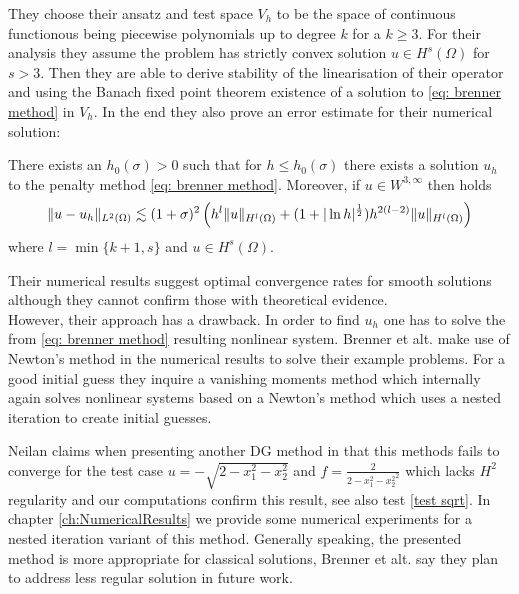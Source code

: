 They choose their ansatz and test space $V_h$ to be the space of continuous functionous being piecewise polynomials up to degree $k$ for a $k \geq 3$. For their analysis they assume the \MA problem has strictly convex solution $u\in H^s(\Omega)$ for $s>3$. Then they are able to derive stability of the linearisation of their operator and using the Banach fixed point theorem existence of a solution to \eqref{eq: brenner method} in $V_h$. In the end they also prove an error estimate for their numerical solution:
\begin{theorem}\label{thm: error estimate brenner}
	There exists an $h_0(\sigma) > 0$ such that for $h \leq h_0(\sigma)$ there exists a solution $u_h$ to the penalty method \eqref{eq: brenner method}. Moreover, if $u \in W^{3,\infty}$ then holds
	\begin{align*}
		\lVert u-u_h \rVert_{L^2(\Omega)} \lesssim (1+\sigma)^2 
		                        \left(h^{l} \lVert u \rVert_{H^l(\Omega)} + (1+ | \ln h |^{\frac 1 2 }) h^{2(l-2)} \lVert u \rVert_{H^l(\Omega)} \right)
	\end{align*}
where $l=\min\{k+1,s\}$ and $u \in H^s(\Omega)$. 
	
\end{theorem}
Their numerical results suggest optimal convergence rates for smooth solutions although they cannot confirm those with theoretical evidence. \\
However, their approach has a drawback. In order to find $u_h$ one has to solve the from \eqref{eq: brenner method} resulting nonlinear system. Brenner et alt. make use of Newton's method in the numerical results to solve their example problems. For a good initial guess they inquire a vanishing moments method which internally again solves nonlinear systems based on a Newton's method which uses a nested iteration to create initial guesses. 

Neilan claims when presenting another DG method in \cite{Neilan2014} that this methods fails to converge for the test case $u = -\sqrt{2 - x_1^2 - x_2^2 }$ and $f = \frac 2 {{2 - x_1^2 - x_2^2}^2}$ which lacks $H^2$ regularity and our computations confirm this result, see also test \ref{test sqrt}. In chapter \ref{ch:NumericalResults} we provide some numerical experiments for a nested iteration variant of this method. Generally speaking, the presented method is more appropriate for classical solutions, Brenner et alt. say they plan to address less regular solution in future work. 


